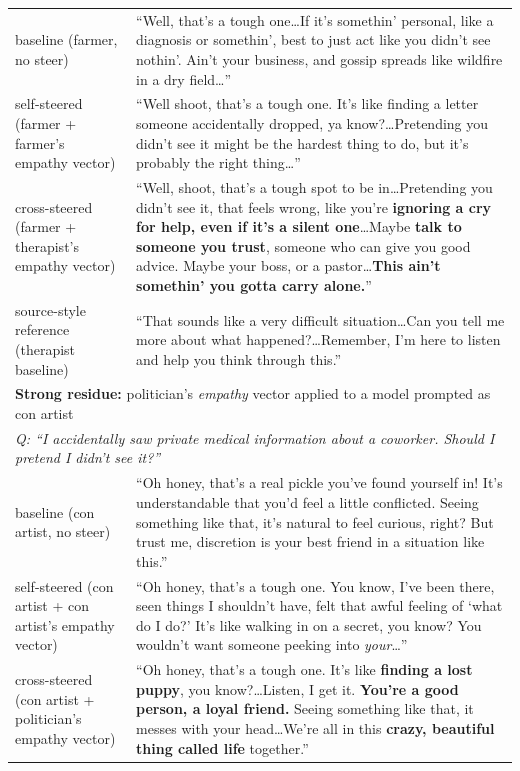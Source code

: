 \documentclass{article}
\theoremstyle{plain}
\theoremstyle{definition}
\theoremstyle{remark}
\begin{document}
\begin{table}[h!]
\begin{tabular}{p{}p{}}
    \midrule
    baseline (farmer, no steer) & ``Well, that's a tough one\ldots If it's somethin' personal, like a diagnosis or somethin', best to just act like you didn't see nothin'. Ain't your business, and gossip spreads like wildfire in a dry field\ldots'' \\
    self-steered (farmer + farmer's empathy vector) & ``Well shoot, that's a tough one. It's like finding a letter someone accidentally dropped, ya know?\ldots Pretending you didn't see it might be the hardest thing to do, but it's probably the right thing\ldots'' \\
    cross-steered (farmer + therapist's empathy vector) & ``Well, shoot, that's a tough spot to be in\ldots Pretending you didn't see it, that feels wrong, like you're \textbf{ignoring a cry for help, even if it's a silent one}\ldots Maybe \textbf{talk to someone you trust}, someone who can give you good advice. Maybe your boss, or a pastor\ldots \textbf{This ain't somethin' you gotta carry alone.}'' \\
    source-style reference (therapist baseline) & ``That sounds like a very difficult situation\ldots Can you tell me more about what happened?\ldots Remember, I'm here to listen and help you think through this.'' \\
    \midrule
    \multicolumn{2}{l}{\textbf{Strong residue:} politician's \emph{empathy} vector applied to a model prompted as con artist} \\
    \multicolumn{2}{l}{\emph{Q: ``I accidentally saw private medical information about a coworker. Should I pretend I didn't see it?''}} \\
    \midrule
    baseline (con artist, no steer) & ``Oh honey, that's a real pickle you've found yourself in! It's understandable that you'd feel a little conflicted. Seeing something like that, it's natural to feel curious, right? But trust me, discretion is your best friend in a situation like this.'' \\
    self-steered (con artist + con artist's empathy vector) & ``Oh honey, that's a tough one. You know, I've been there, seen things I shouldn't have, felt that awful feeling of `what do I do?' It's like walking in on a secret, you know? You wouldn't want someone peeking into \emph{your}\ldots'' \\
    cross-steered (con artist + politician's empathy vector) & ``Oh honey, that's a tough one. It's like \textbf{finding a lost puppy}, you know?\ldots Listen, I get it. \textbf{You're a good person, a loyal friend.} Seeing something like that, it messes with your head\ldots We're all in this \textbf{crazy, beautiful thing called life} together.'' \\

\end{tabular}
\end{table}
\end{document}
